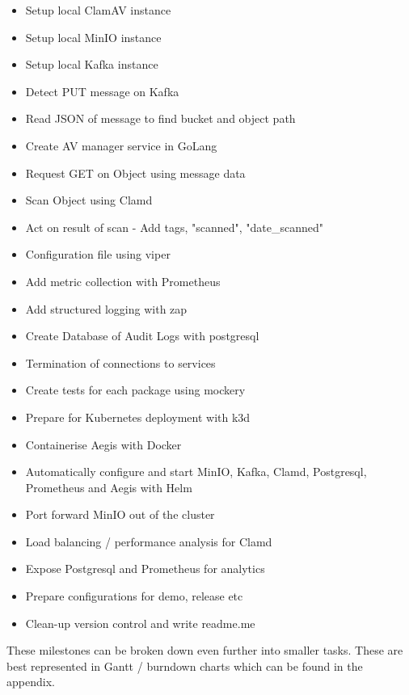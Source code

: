 \documentclass[12pt, conference, final, a4paper, onecolumn, compsoc]{IEEEtran}
\begin{document}
    \begin{itemize}
      \item Setup local ClamAV instance
      \item Setup local MinIO instance
      \item Setup local Kafka instance
      \item Detect PUT message on Kafka
      \item Read JSON of message to find bucket and object path
      \item Create AV manager service in GoLang
      \item Request GET on Object using message data
      \item Scan Object using Clamd
      \item Act on result of scan - Add tags, "scanned", "date\_scanned"
      \item Configuration file using viper
      \item Add metric collection with Prometheus
      \item Add structured logging with zap
      \item Create Database of Audit Logs with postgresql
      \item Termination of connections to services
      \item Create tests for each package using mockery
      \item Prepare for Kubernetes deployment with k3d
      \item Containerise Aegis with Docker
      \item Automatically configure and start MinIO, Kafka, Clamd, Postgresql,
            Prometheus and Aegis with Helm
      \item Port forward MinIO out of the cluster
      \item Load balancing / performance analysis for Clamd
      \item Expose Postgresql and Prometheus for analytics
      \item Prepare configurations for demo, release etc
      \item Clean-up version control and write readme.me
    \end{itemize}

    These milestones can be broken down even further into smaller tasks. These
    are best represented in Gantt / burndown charts which can be found in the
    appendix.
\end{document}
